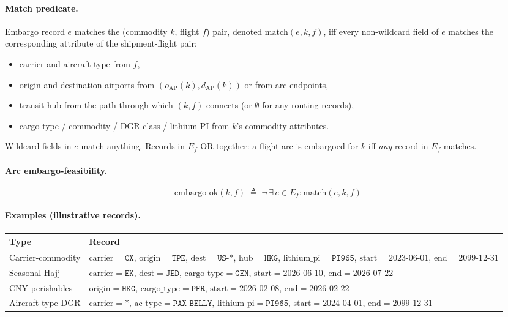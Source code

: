 \documentclass[11pt,a4paper]{article}
\newcommand{\defeq}{\triangleq}
\theoremstyle{definition}
\begin{document}
\paragraph{Match predicate.}
Embargo record \(e\) matches the (commodity \(k\), flight \(f\)) pair, denoted
\(\text{match}(e, k, f)\), iff every non-wildcard field of \(e\) matches the
corresponding attribute of the shipment-flight pair:
\begin{itemize}[noitemsep]
  \item carrier and aircraft type from \(f\),
  \item origin and destination airports from \((o_{\text{AP}}(k), d_{\text{AP}}(k))\)
        or from arc endpoints,
  \item transit hub from the path through which \((k, f)\) connects (or \(\emptyset\) for
        any-routing records),
  \item cargo type / commodity / DGR class / lithium PI from \(k\)'s commodity
        attributes.
\end{itemize}
Wildcard fields in \(e\) match anything. Records in \(E_f\) OR together: a flight-arc
is embargoed for \(k\) iff \emph{any} record in \(E_f\) matches.

\paragraph{Arc embargo-feasibility.}
\begin{equation}
  \text{embargo\_ok}(k, f) \;\defeq\;
    \neg \, \exists\, e \in E_f : \text{match}(e, k, f)
  \label{eq:embargo-feasibility}
\end{equation}

\paragraph{Examples (illustrative records).}
\begin{center}
\begin{tabular}{lp{10.5cm}}
\toprule
Type & Record \\
\midrule
Carrier-commodity & \(\text{carrier}=\texttt{CX},\, \text{origin}=\texttt{TPE},\, \text{dest}=\texttt{US-*},\, \text{hub}=\texttt{HKG},\, \text{lithium\_pi}=\texttt{PI965},\, \text{start}=2023\text{-}06\text{-}01,\, \text{end}=2099\text{-}12\text{-}31\) \\
Seasonal Hajj & \(\text{carrier}=\texttt{EK},\, \text{dest}=\texttt{JED},\, \text{cargo\_type}=\texttt{GEN},\, \text{start}=2026\text{-}06\text{-}10,\, \text{end}=2026\text{-}07\text{-}22\) \\
CNY perishables & \(\text{origin}=\texttt{HKG},\, \text{cargo\_type}=\texttt{PER},\, \text{start}=2026\text{-}02\text{-}08,\, \text{end}=2026\text{-}02\text{-}22\) \\
Aircraft-type DGR & \(\text{carrier}=\texttt{*},\, \text{ac\_type}=\texttt{PAX\_BELLY},\, \text{lithium\_pi}=\texttt{PI965},\, \text{start}=2024\text{-}04\text{-}01,\, \text{end}=2099\text{-}12\text{-}31\) \\
\bottomrule
\end{tabular}
\end{center}
\end{document}

